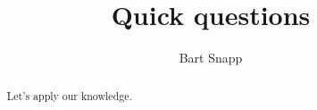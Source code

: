 \documentclass[handout,nooutcomes,noauthor]{ximera}
\title{Quick questions}
\author{Bart Snapp}
\begin{document}
\begin{abstract}
  Let's apply our knowledge.
\end{abstract}
\maketitle


\begin{listOutcomes}
\item 
\end{listOutcomes}


\mynewpage



\begin{question}
  
\end{question}

\mynewpage


\begin{question}
  
\end{question}

\mynewpage


\begin{question}
  
\end{question}
\end{document}
